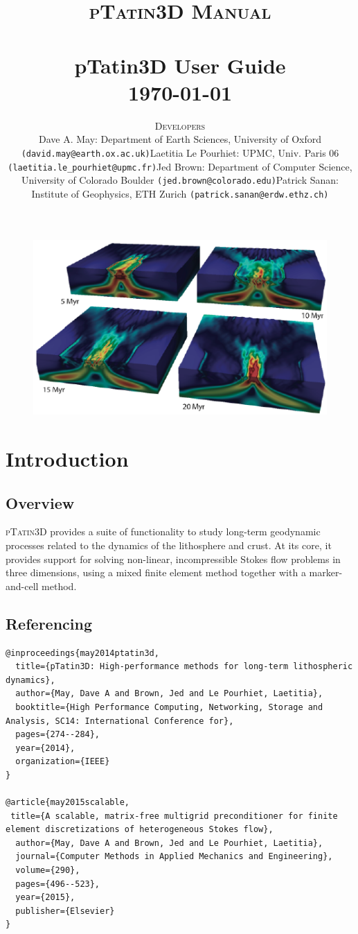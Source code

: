 \documentclass[paper=a4, fontsize=10pt,twoside]{scrartcl}
\title{	\normalsize \textsc{pTatin3D Manual} 	%
	\\[2.0cm]									%
	\HRule{2pt} \\ [0.3cm]						%
	\LARGE \textbf{{pTatin3D User Guide}}			%
	\HRule{2pt} \\ [0.5cm]						%
	\normalsize \today							%
	}
\author{
{\normalsize \textsc{Developers}}
\begin{itemize}
\item[-] Dave A. May: Department of Earth Sciences, University of Oxford \texttt{(david.may@earth.ox.ac.uk)}
\item[-] Laetitia Le Pourhiet: UPMC, Univ. Paris 06  \texttt{(laetitia.le\_pourhiet@upmc.fr)}
\item[-] Jed Brown: Department of Computer Science, University of Colorado Boulder \texttt{(jed.brown@colorado.edu)}
\item[-] Patrick Sanan: Institute of Geophysics, ETH Zurich \texttt{(patrick.sanan@erdw.ethz.ch)}
\end{itemize}
}
\makeatletter
\newcommand{\ptat}{{{\textsc{pTatin3D}}}}
\def\printtitle{%
    {
    	\centering \@title\par}
		 	\vspace{10mm}
	\begin{figure} [hbtp]
	\includegraphics[height=0.4\textheight]{figs/ptat3d_front_page_small.pdf}
	\end{figure}
    }
\def\printauthor{%
    {\centering \large \@author}}
\makeatother
\begin{document}
\thispagestyle{empty}%

\printtitle%
  	\vfill
\printauthor%




\newpage
{}
\tableofcontents{}

\newpage


\section{Introduction}

\subsection{Overview}
{\ptat} provides a suite of functionality to study long-term geodynamic processes related to the dynamics of the lithosphere and crust.
At its core, it provides support for solving non-linear, incompressible Stokes flow problems in three dimensions, using a mixed finite element method together with a marker-and-cell method.

\subsection{Referencing}

\begin{lstlisting}
@inproceedings{may2014ptatin3d,
  title={pTatin3D: High-performance methods for long-term lithospheric dynamics},
  author={May, Dave A and Brown, Jed and Le Pourhiet, Laetitia},
  booktitle={High Performance Computing, Networking, Storage and Analysis, SC14: International Conference for},
  pages={274--284},
  year={2014},
  organization={IEEE}
}

@article{may2015scalable,
 title={A scalable, matrix-free multigrid preconditioner for finite element discretizations of heterogeneous Stokes flow},
  author={May, Dave A and Brown, Jed and Le Pourhiet, Laetitia},
  journal={Computer Methods in Applied Mechanics and Engineering},
  volume={290},
  pages={496--523},
  year={2015},
  publisher={Elsevier}
}
\end{lstlisting}

\end{document}
